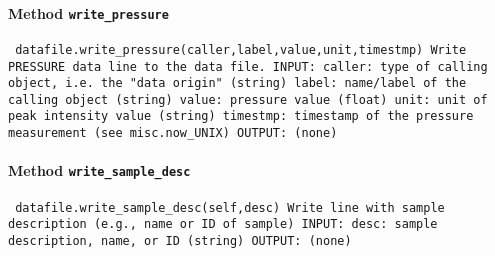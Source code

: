 \paragraph{Method \texttt{write_pressure}}
\vspace{1ex}
\texttt{\newline
datafile.write_pressure(caller,label,value,unit,timestmp)\newline
\newline
Write PRESSURE data line to the data file.\newline
\newline
INPUT:\newline
caller: type of calling object, i.e. the "data origin" (string)\newline
label: name/label of the calling object (string)\newline
value: pressure value (float)\newline
unit: unit of peak intensity value (string)\newline
timestmp: timestamp of the pressure measurement (see misc.now_UNIX)\newline
\newline
OUTPUT:\newline
(none)\newline
\newline
}

\paragraph{Method \texttt{write_sample_desc}}
\vspace{1ex}
\texttt{\newline
datafile.write_sample_desc(self,desc)\newline
\newline
Write line with sample description (e.g., name or ID of sample)\newline
\newline
INPUT:\newline
desc: sample description, name, or ID (string)\newline
\newline
OUTPUT:\newline
(none)\newline
\newline
}

